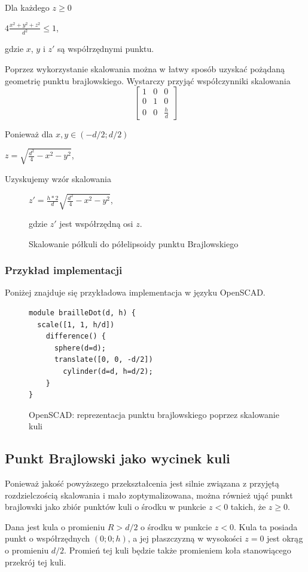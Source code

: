 \documentclass[12pt,a4paper]{article}
\begin{document}
Dla każdego $z \geq 0$

$4\frac{x^2+y^2+z^2}{d^2} \leq 1$,

gdzie $x$, $y$ i $z'$ są współrzędnymi punktu.

Poprzez wykorzystanie skalowania można w łatwy sposób uzyskać pożądaną geometrię punktu brajlowskiego. Wystarczy przyjąć współczynniki skalowania
$$
\begin{bmatrix}
1 & 0 & 0 \\
0 & 1 & 0 \\
0 & 0 & \frac{h}{d}
\end{bmatrix}
$$

Ponieważ dla $x,y \in (-d/2; d/2)$

$z = \sqrt{\frac{d^2}{4} - x^2 - y^2}$,

Uzyskujemy wzór skalowania


\begin{figure}
$z' = \frac{h*2}{d} \sqrt{\frac{d^2}{4} - x^2 - y^2}$,

gdzie $z'$ jest współrzędną osi $z$.
\caption{Skalowanie półkuli do półelipsoidy punktu Brajlowskiego}
\end{figure}

\subsubsection{Przykład implementacji}
Poniżej znajduje się przykładowa implementacja w języku OpenSCAD.

\begin{figure}
\begin{verbatim}
module brailleDot(d, h) {
  scale([1, 1, h/d])
    difference() {
      sphere(d=d);
      translate([0, 0, -d/2])
        cylinder(d=d, h=d/2);
    }
}
\end{verbatim}
\caption{OpenSCAD: reprezentacja punktu brajlowskiego poprzez skalowanie kuli}
\end{figure}

\subsection{Punkt Brajlowski jako wycinek kuli}
Ponieważ jakość powyższego przekształcenia jest silnie związana z przyjętą rozdzielczością skalowania i mało zoptymalizowana, można również ująć punkt brajlowski jako zbiór punktów kuli o środku w punkcie $z<0$ takich, że $z \geq 0$.

Dana jest kula o promieniu $R>d/2$ o środku w punkcie $z<0$.
Kula ta posiada punkt o współrzędnych $(0;0;h)$, a jej płaszczyzną w wysokości $z=0$ jest okrąg o promieniu $d/2$.
Promień tej kuli będzie także promieniem koła stanowiącego przekrój tej kuli.
\end{document}
